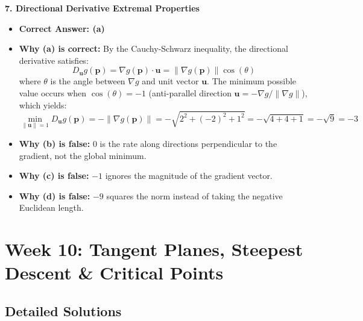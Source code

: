 \textbf{7. Directional Derivative Extremal Properties}
\begin{itemize}
    \item \textbf{Correct Answer: (a)}
    \item \textbf{Why (a) is correct:} By the Cauchy-Schwarz inequality, the directional derivative satisfies:
    \begin{equation*}
    D_{\mathbf{u}} g(\mathbf{p}) = \nabla g(\mathbf{p}) \cdot \mathbf{u} = \|\nabla g(\mathbf{p})\| \cos(\theta)
    \end{equation*}
    where $\theta$ is the angle between $\nabla g$ and unit vector $\mathbf{u}$.
    The minimum possible value occurs when $\cos(\theta) = -1$ (anti-parallel direction $\mathbf{u} = -\nabla g / \|\nabla g\|$), which yields:
    \begin{equation*}
    \min_{\|\mathbf{u}\|=1} D_{\mathbf{u}} g(\mathbf{p}) = -\|\nabla g(\mathbf{p})\| = -\sqrt{2^2 + (-2)^2 + 1^2} = -\sqrt{4 + 4 + 1} = -\sqrt{9} = -3
    \end{equation*}
    \item \textbf{Why (b) is false:} 0 is the rate along directions perpendicular to the gradient, not the global minimum.
    \item \textbf{Why (c) is false:} $-1$ ignores the magnitude of the gradient vector.
    \item \textbf{Why (d) is false:} $-9$ squares the norm instead of taking the negative Euclidean length.
\end{itemize}

\section*{Week 10: Tangent Planes, Steepest Descent \& Critical Points}

\subsection*{Detailed Solutions}

